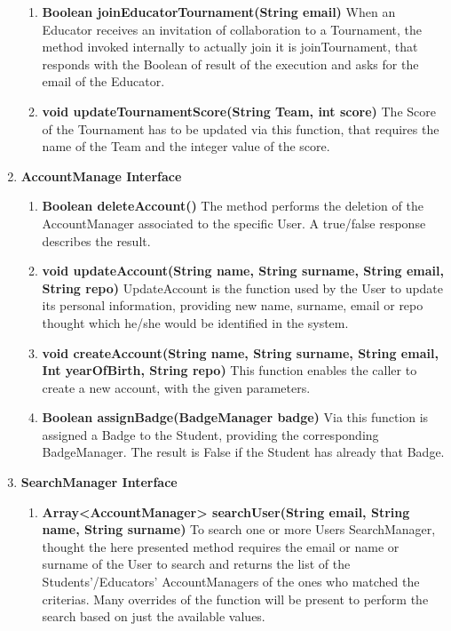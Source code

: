 \begin{enumerate}
\begin{enumerate}[label=$\bullet$]
        \item \textbf{Boolean joinEducatorTournament(String email)} When an Educator receives an invitation of collaboration to a Tournament, the method invoked internally to actually join it is joinTournament, that responds with the Boolean of result of the execution and asks for the email of the Educator.
        \item \textbf{void updateTournamentScore(String Team, int score)} The Score of the Tournament has to be updated via this function, that requires the name of the Team and the integer value of the score.
        \end{enumerate}
    \item \textbf{AccountManage Interface} 
        \begin{enumerate}[label=$\bullet$]
            \item \textbf{Boolean deleteAccount()} The method performs the deletion of the AccountManager associated to the specific User. A true/false response describes the result.
            \item \textbf{void updateAccount(String name, String surname, String email, String repo)} UpdateAccount is the function used by the User to update its personal information, providing new name, surname, email or repo thought which he/she would be identified in the system.
            \item \textbf{void createAccount(String name, String surname, String email, Int yearOfBirth, String repo)} This function enables the caller to create a new account, with the given parameters.
            \item \textbf{Boolean assignBadge(BadgeManager badge)} Via this function is assigned a Badge to the Student, providing the corresponding BadgeManager. The result is False if the Student has already that Badge.
        \end{enumerate}
    \item \textbf{SearchManager Interface} 
        \begin{enumerate}[label=$\bullet$]
            \item \textbf{Array<AccountManager> searchUser(String email, String name, String surname)} To search one or more Users SearchManager, thought the here presented method requires the email or name or surname of the User to search and returns the list of the Students'/Educators' AccountManagers of the ones who matched the criterias. Many overrides of the function will be present to perform the search based on just the available values.

\end{enumerate}
\end{enumerate}
